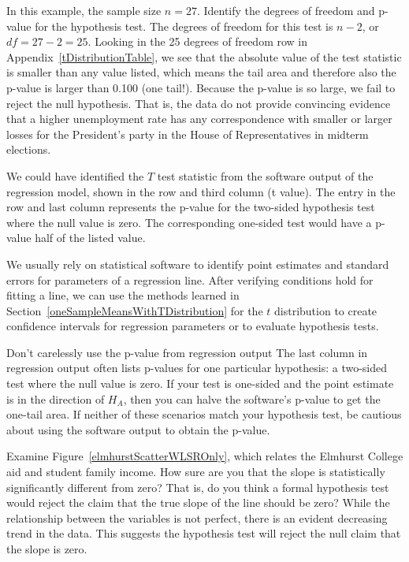 \begin{example}{In this example, the sample size $n=27$. Identify the degrees of freedom and p-value for the hypothesis test.}
The degrees of freedom for this test is $n-2$, or $df = 27-2 = 25$. Looking in the 25 degrees of freedom row in Appendix~\ref{tDistributionTable}, we see that the absolute value of the test statistic is smaller than any value listed, which means the tail area and therefore also the p-value is larger than 0.100 (one tail!). Because the p-value is so large, we fail to reject the null hypothesis. That is, the data do not provide convincing evidence that a higher unemployment rate has any correspondence with smaller or larger losses for the President's party in the House of Representatives in midterm elections.
\end{example}

We could have identified the $T$ test statistic from the software output of the regression model, shown in the  row and third column (t value). The entry in the  row and last column represents the p-value for the two-sided hypothesis test where the null value is zero. The corresponding one-sided test would have a p-value half of the listed value.

\begin{termBox}{
We usually rely on statistical software to identify point estimates and standard errors for parameters of a regression line. After verifying conditions hold for fitting a line, we can use the methods learned in Section~\ref{oneSampleMeansWithTDistribution} for the $t$ distribution to create confidence intervals for regression parameters or to evaluate hypothesis tests.}
\end{termBox}

\begin{caution}{Don't carelessly use the p-value from regression output}
{The last column in regression output often lists p-values for one particular hypothesis: a two-sided test where the null value is zero. If your test is one-sided and the point estimate is in the direction of $H_A$, then you can halve the software's p-value to get the one-tail area. If neither of these scenarios match your hypothesis test, be cautious about using the software output to obtain the p-value.}
\end{caution}

\begin{example}{Examine Figure~\vref{elmhurstScatterWLSROnly}, which relates the Elmhurst College aid and student family income. How sure are you that the slope is statistically significantly different from zero? That is, do you think a formal hypothesis test would reject the claim that the true slope of the line should be zero?} \label{overallAidIncomeInformalAssessmentOfRegressionLineSlope}
While the relationship between the variables is not perfect, there is an evident decreasing trend in the data. This suggests the hypothesis test will reject the null claim that the slope is zero.
\end{example}

